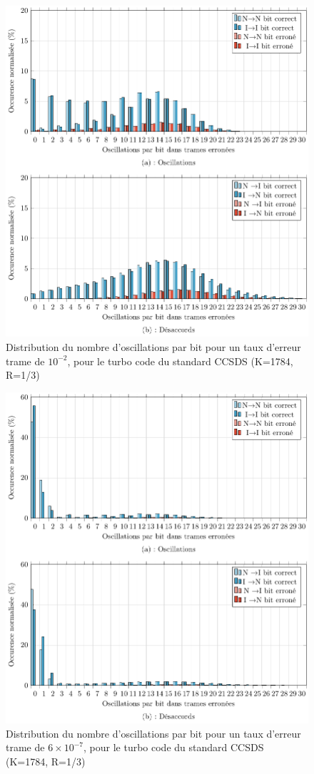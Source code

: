 \begin{figure}[!ht]
	\centering
	\includegraphics[width=.9\textwidth]{main/ch2_fig/tikz/d_ccsds_10-2.pdf}
	\caption{Distribution du nombre d'oscillations par bit pour un taux d'erreur trame de $10^{-2}$, pour le turbo code du standard CCSDS (K=1784, R=1/3)\label{fig:d1_ccsds}}
\end{figure}

\begin{figure}[!ht]
	\centering
	\includegraphics[width=.9\textwidth]{main/ch2_fig/tikz/d_ccsds_610-7.pdf}
	\caption{Distribution du nombre d'oscillations par bit pour un taux d'erreur trame de $6\times10^{-7}$, pour le turbo code du standard CCSDS (K=1784, R=1/3)\label{fig:d2_ccsds}}
\end{figure}


